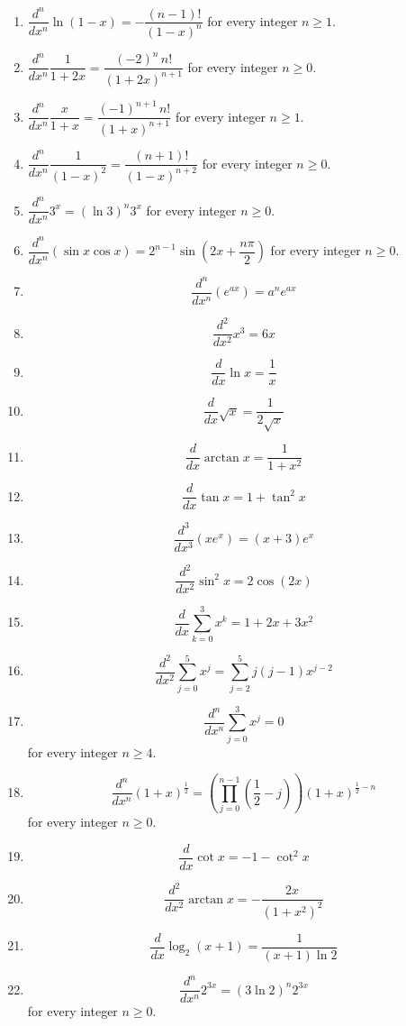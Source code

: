 \documentclass[11pt,a4paper]{article}
\begin{document}
\begin{enumerate}
\item $\dfrac{d^n}{dx^n}\ln(1-x)=-\dfrac{(n-1)!}{(1-x)^{n}}$ for every integer $n\ge1$.
\item $\dfrac{d^n}{dx^n}\dfrac{1}{1+2x}=\dfrac{(-2)^{n}\,n!}{(1+2x)^{n+1}}$ for every integer $n\ge0$.
\item $\dfrac{d^n}{dx^n}\dfrac{x}{1+x}=\dfrac{(-1)^{n+1}\,n!}{(1+x)^{n+1}}$ for every integer $n\ge1$.
\item $\dfrac{d^n}{dx^n}\dfrac{1}{(1-x)^{2}}=\dfrac{(n+1)!}{(1-x)^{n+2}}$ for every integer $n\ge0$.
\item $\dfrac{d^n}{dx^n}3^{x}=\left(\ln 3\right)^{n}3^{x}$ for every integer $n\ge0$.
\item $\dfrac{d^n}{dx^n}\left(\sin x\cos x\right)=2^{n-1}\sin\left(2x+\dfrac{n\pi}{2}\right)$ for every integer $n\ge0$.
\item \[ \frac{d^{n}}{dx^{n}} \left(e^{a x}\right) = a^{n} e^{a x} \]
\item \[ \frac{d^{2}}{dx^{2}} x^{3} = 6x \]
\item \[ \frac{d}{dx} \ln x = \frac{1}{x} \]
\item \[ \frac{d}{dx} \sqrt{x} = \frac{1}{2\sqrt{x}} \]
\item \[ \frac{d}{dx} \arctan x = \frac{1}{1 + x^{2}} \]
\item \[ \frac{d}{dx} \tan x = 1 + \tan^{2} x \]
\item \[ \frac{d^{3}}{dx^{3}} \left(x e^{x}\right) = \left(x + 3\right) e^{x} \]
\item \[ \frac{d^{2}}{dx^{2}} \sin^{2} x = 2\cos\left(2x\right) \]
\item \[ \frac{d}{dx} \sum_{k=0}^{3} x^{k} = 1 + 2x + 3x^{2} \]
\item \[ \frac{d^{2}}{dx^{2}} \sum_{j=0}^{5} x^{j} = \sum_{j=2}^{5} j(j-1) x^{j-2} \]
\item \[ \frac{d^{n}}{dx^{n}} \sum_{j=0}^{3} x^{j} = 0 \] for every integer $n \ge 4$.
\item \[ \frac{d^{n}}{dx^{n}} \left(1+x\right)^{\frac{1}{2}} = \left(\prod_{j=0}^{n-1} \left(\frac{1}{2} - j\right)\right) \left(1+x\right)^{\frac{1}{2} - n} \] for every integer $n \ge 0$.
\item \[ \frac{d}{dx} \cot x = -1 - \cot^{2} x \]
\item \[ \frac{d^{2}}{dx^{2}} \arctan x = -\frac{2x}{\left(1+x^{2}\right)^{2}} \]
\item \[ \frac{d}{dx} \log_{2}\left(x+1\right) = \frac{1}{\left(x+1\right)\ln 2} \]
\item \[ \frac{d^{n}}{dx^{n}} 2^{3x} = \left(3\ln 2\right)^{n} 2^{3x} \] for every integer $n \ge 0$.

\end{enumerate}
\end{document}
